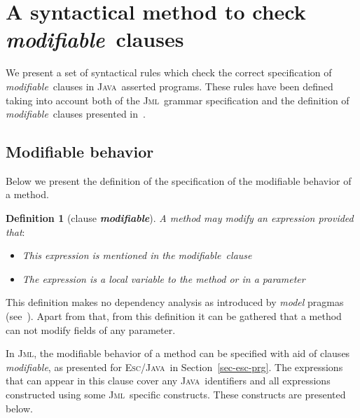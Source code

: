 \documentclass[a4paper]{llncs}
\newcommand{\jml}{\textsc{Jml}}
\newcommand{\escj}{\textsc{Esc/Java}}
\newcommand{\java}{\textsc{Java}}
\newcommand{\modif}{\textit{modifiable}}
\newtheorem {df}{Definition}
\begin{document}
\section{A syntactical method to check \modif~clauses}
\label{sec-giv-sin-def}
We present a set of syntactical rules which check the correct
specification of \modif~clauses in \java~asserted programs. These
rules have been defined taking into account both of the \jml~grammar
specification and the definition of \modif~clauses presented
in~\cite{LeavensBR00}.




\subsection{Modifiable behavior}
Below we present the definition of the specification of the modifiable
behavior of a method.
\begin{df}[clause {\bf \it modifiable}]
\label{def-mod}
A method may modify an expression provided that$:$ 
\begin{itemize}
\item This expression is mentioned in the \modif~clause
\item The expression is a local variable to the method or in a
parameter
\end{itemize}
\end{df}
This definition makes no dependency analysis as introduced by
\emph{model} pragmas (see~\cite{LeavensBR00}). Apart from that, from this
definition it can be
gathered that a method can not modify fields of any parameter.

In \jml, the modifiable behavior of a method can be specified with
aid of clauses \modif, as presented for \escj~in
Section~\ref{sec-esc-prg}. The expressions that can appear in this
clause cover any
\java~identifiers and all expressions constructed using some
\jml~specific constructs. These constructs are presented below.
\end{document}

